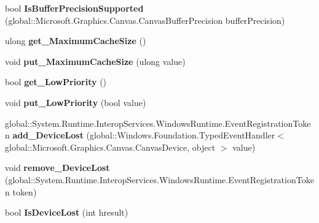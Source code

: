 \begin{DoxyCompactItemize}
bool {\bfseries Is\+Buffer\+Precision\+Supported} (global\+::\+Microsoft.\+Graphics.\+Canvas.\+Canvas\+Buffer\+Precision buffer\+Precision)
\item 
\mbox{\label{class_microsoft_1_1_graphics_1_1_canvas_1_1_canvas_device_a5f095678b43b4ace5f118aa2556deffe}} 
ulong {\bfseries get\+\_\+\+Maximum\+Cache\+Size} ()
\item 
\mbox{\label{class_microsoft_1_1_graphics_1_1_canvas_1_1_canvas_device_a87716d3ac1ed253fcee0a5e307d24b50}} 
void {\bfseries put\+\_\+\+Maximum\+Cache\+Size} (ulong value)
\item 
\mbox{\label{class_microsoft_1_1_graphics_1_1_canvas_1_1_canvas_device_a95f4876747bf8ac6c5fd2b67a83fed4f}} 
bool {\bfseries get\+\_\+\+Low\+Priority} ()
\item 
\mbox{\label{class_microsoft_1_1_graphics_1_1_canvas_1_1_canvas_device_ad1a2be7ca3c55a404a27d0e562278094}} 
void {\bfseries put\+\_\+\+Low\+Priority} (bool value)
\item 
\mbox{\label{class_microsoft_1_1_graphics_1_1_canvas_1_1_canvas_device_a631e1f27d9faf64d8b1ee234ffde2ed8}} 
global\+::\+System.\+Runtime.\+Interop\+Services.\+Windows\+Runtime.\+Event\+Registration\+Token {\bfseries add\+\_\+\+Device\+Lost} (global\+::\+Windows.\+Foundation.\+Typed\+Event\+Handler$<$ global\+::\+Microsoft.\+Graphics.\+Canvas.\+Canvas\+Device, object $>$ value)
\item 
\mbox{\label{class_microsoft_1_1_graphics_1_1_canvas_1_1_canvas_device_a4a4a0a58940cbe69bb830cd13b27e86c}} 
void {\bfseries remove\+\_\+\+Device\+Lost} (global\+::\+System.\+Runtime.\+Interop\+Services.\+Windows\+Runtime.\+Event\+Registration\+Token token)
\item 
\mbox{\label{class_microsoft_1_1_graphics_1_1_canvas_1_1_canvas_device_aa2c3386bb9c17effeb042c9f84c8037c}} 
bool {\bfseries Is\+Device\+Lost} (int hresult)

\end{DoxyCompactItemize}
